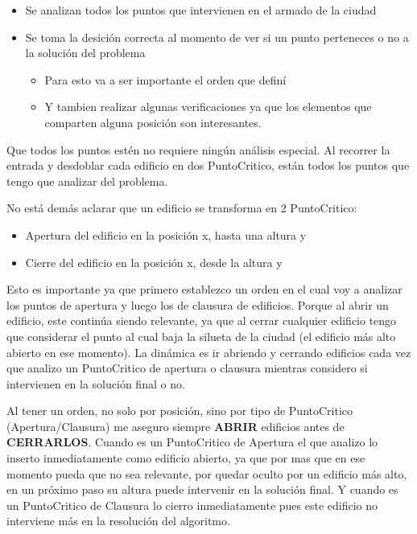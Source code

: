 \begin{itemize}
	\item Se analizan todos los puntos que intervienen en el armado de la ciudad
	\item Se toma la desición correcta al momento de ver si un punto perteneces o no a la solución del problema
		\begin{itemize}
		\item Para esto va a ser importante el orden que definí
		\item Y tambien realizar algunas verificaciones ya que los elementos que comparten alguna posición son interesantes.
		\end{itemize}
\end{itemize}

Que todos los puntos estén no requiere ningún análisis especial. Al recorrer la entrada y desdoblar cada edificio en dos PuntoCritico, están todos los puntos que tengo que analizar del problema.

No está demás aclarar que un edificio se transforma en 2 PuntoCritico:
	\begin{itemize}
		\item Apertura del edificio en la posición x, hasta una altura y
		\item Cierre del edificio en la posición x, desde la altura y
	\end{itemize}

Esto es importante ya que primero establezco un orden en el cual voy a analizar los puntos de apertura y luego los de clausura de edificios. Porque al abrir un edificio, este continúa siendo relevante, ya que al cerrar cualquier edificio tengo que considerar el punto al cual baja la silueta de la ciudad (el edificio más alto abierto en ese momento). La dinámica es ir abriendo y cerrando edificios cada vez que analizo un PuntoCritico de apertura o clausura mientras considero si intervienen en la solución final o no.

Al tener un orden, no solo por posición, sino por tipo de PuntoCritico (Apertura/Clausura) me aseguro siempre \textbf{ABRIR} edificios antes de \textbf{CERRARLOS}. Cuando es un PuntoCritico de Apertura el que analizo lo inserto inmediatamente como edificio abierto, ya que por mas que en ese momento pueda que no sea relevante, por quedar oculto por un edificio más alto, en un próximo paso su altura puede intervenir en la solución final.
Y cuando es un PuntoCritico de Clausura lo cierro inmediatamente pues este edificio no interviene más en la resolución del algoritmo.


